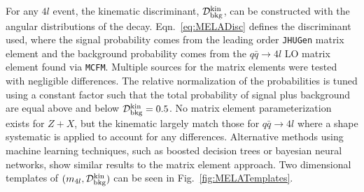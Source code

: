 For any $4l$ event, the kinematic discriminant, $\mathcal{D}_{\rm{bkg}}^{\rm{kin}}$, can be constructed with the angular distributions of the decay. Eqn.~\ref{eq:MELADisc} defines the discriminant used, where the signal probability comes from the leading order {\tt JHUGen} matrix element and the background probability comes from the $q\bar{q}\rightarrow 4l$ LO matrix element found via {\tt MCFM}. Multiple sources for the matrix elements were tested with negligible differences. The relative normalization of the probabilities is tuned using a constant factor such that the total probability of signal plus background are equal above and below $\mathcal{D}_{\rm{bkg}}^{\rm{kin}} = 0.5$. No matrix element parameterization exists for $Z+X$, but the kinematic largely match those for $q\bar{q}\rightarrow 4l$ where a shape systematic is applied to account for any differences. Alternative methods using machine learning techniques, such as boosted decision trees or bayesian neural networks, show similar results to the matrix element approach. Two dimensional templates of $(m_{4l},\mathcal{D}_{\rm{bkg}}^{\rm{kin}})$ can be seen in Fig.~\ref{fig:MELATemplates}.

